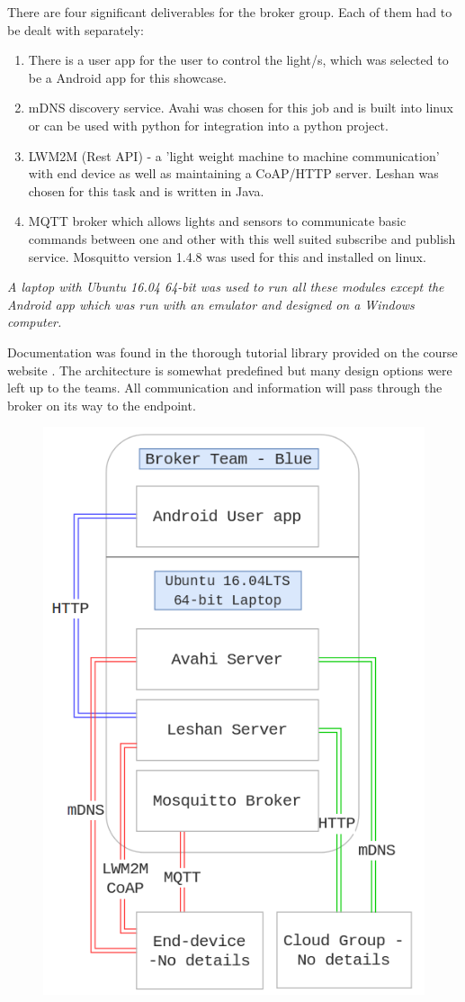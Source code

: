 \documentclass[11pt]{article}
\begin{document}
There are four significant deliverables for the broker group. Each of them had to be dealt with separately: 
\begin{enumerate}
	\item There is a user app for the user to control the light/s, which was selected to be a Android app for this showcase.
	\item mDNS discovery service. Avahi was chosen for this job and is built into linux or can be used with python for integration into a python project.
	\item LWM2M (Rest API) - a 'light weight machine to machine communication' with end device as well as maintaining a CoAP/HTTP server. Leshan was chosen for this task and is written in Java.
	\item MQTT broker which allows lights and sensors to communicate basic commands between one and other with this well suited subscribe and publish service. Mosquitto version 1.4.8 was used for this and installed on linux.
\end{enumerate}

\textit{A laptop with Ubuntu 16.04 64-bit was used to run all these modules except the Android app which was run with an emulator and designed on a Windows computer.}

Documentation was found in the thorough tutorial library provided on the course website \cite{tut}. The architecture is somewhat predefined but many design options were left up to the teams. All communication and information will pass through the broker on its way to the endpoint.

\begin{figure}[h]
	\begin{center}
		\includegraphics[width=0.6\linewidth]{img/overview}
		\caption{}
		\label{fig:fig2}
	\end{center}
\end{figure}
\end{document}
